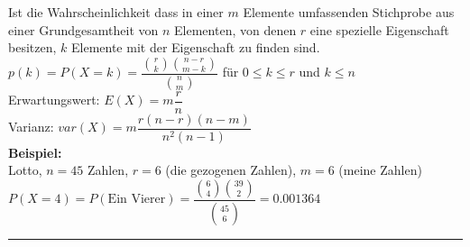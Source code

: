       	
\begin{minipage}{0.7\textwidth}
	Ist die Wahrscheinlichkeit dass in einer $m$ Elemente umfassenden 
	Stichprobe aus einer Grundgesamtheit von $n$ Elementen, von denen $r$ eine
	spezielle Eigenschaft besitzen, $k$ Elemente mit der Eigenschaft zu
	finden sind.\\
	\vspace{5mm} 
	$p(k)=P(X=k)=\dfrac{\binom r k \binom{n-r}{m-k}}{\binom n m}$ 
	\hspace{10mm} für $0\leq k \leq r$ und $k \leq n$\\
	Erwartungswert: \hspace{10mm} $E(X)=m \dfrac{r}{n}$\\
	Varianz: \hspace{22mm} $var(X)=m \dfrac{r(n-r)(n-m)}{n^2(n-1)}$ \\
	{\bf Beispiel:} \\
	Lotto, $n=45$ Zahlen, $r=6$ (die gezogenen Zahlen), $m=6$
	(meine Zahlen) \\
	$P(X=4)=P(\text{Ein Vierer})=\dfrac{\binom 6 4 \binom {39}
	2}{\binom {45} 6}=0.001364$
\end{minipage}
\begin{minipage}{0.3\textwidth}
	
\end{minipage}


\hrule \hspace{3mm}

